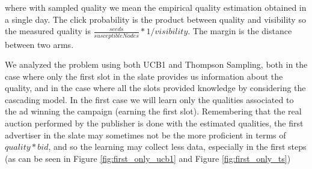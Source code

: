 \documentclass{article}
\begin{document}
where with sampled quality we mean the empirical quality estimation obtained in a single day. The click probability is the product between quality and visibility so the measured quality is $\frac{seeds}{susceptible  Nodes} * 1 / visibility$. The margin is the distance between two arms.

We analyzed the problem using both UCB1 and Thompson Sampling, both in the case where only the first slot in the slate provides us information about the quality, and in the case where all the slots provided knowledge by considering the cascading model.
In the first case we will learn only the qualities associated to the ad winning the campaign (earning the first slot). Remembering that the real auction performed by the publisher is done with the estimated qualities, the first advertiser in the slate may sometimes not be the more proficient in terms of $quality*bid$, and so the learning may collect less data, especially in the first steps (as can be seen in Figure \ref{fig:first_only_ucb1} and Figure \ref{fig:first_only_ts})
\end{document}
